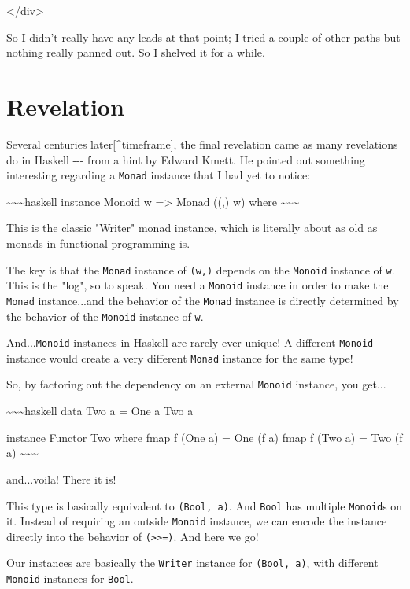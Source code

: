 \documentclass[]{article}
\begin{document}
\textless{}/div\textgreater{}

So I didn't really have any leads at that point; I tried a couple of other paths
but nothing really panned out. So I shelved it for a while.

\section{Revelation}

Several centuries later{[}\^{}timeframe{]}, the final revelation came as many
revelations do in Haskell -\/-\/- from a hint by Edward Kmett. He pointed out
something interesting regarding a \texttt{Monad} instance that I had yet to
notice:

\textasciitilde{}\textasciitilde{}\textasciitilde{}haskell instance Monoid w
=\textgreater{} Monad ((,) w) where
\textasciitilde{}\textasciitilde{}\textasciitilde{}

This is the classic "Writer" monad instance, which is literally about as old as
monads in functional programming is.

The key is that the \texttt{Monad} instance of \texttt{(w,)} depends on the
\texttt{Monoid} instance of \texttt{w}. This is the "log", so to speak. You need
a \texttt{Monoid} instance in order to make the \texttt{Monad} instance...and
the behavior of the \texttt{Monad} instance is directly determined by the
behavior of the \texttt{Monoid} instance of \texttt{w}.

And...\texttt{Monoid} instances in Haskell are rarely ever unique! A different
\texttt{Monoid} instance would create a very different \texttt{Monad} instance
for the same type!

So, by factoring out the dependency on an external \texttt{Monoid} instance, you
get...

\textasciitilde{}\textasciitilde{}\textasciitilde{}haskell data Two a = One a
\textbar{} Two a

instance Functor Two where fmap f (One a) = One (f a) fmap f (Two a) = Two (f a)
\textasciitilde{}\textasciitilde{}\textasciitilde{}

and...voila! There it is!

This type is basically equivalent to \texttt{(Bool,\ a)}. And \texttt{Bool} has
multiple \texttt{Monoid}s on it. Instead of requiring an outside \texttt{Monoid}
instance, we can encode the instance directly into the behavior of
\texttt{(\textgreater{}\textgreater{}=)}. And here we go!

Our instances are basically the \texttt{Writer} instance for
\texttt{(Bool,\ a)}, with different \texttt{Monoid} instances for \texttt{Bool}.
\end{document}

